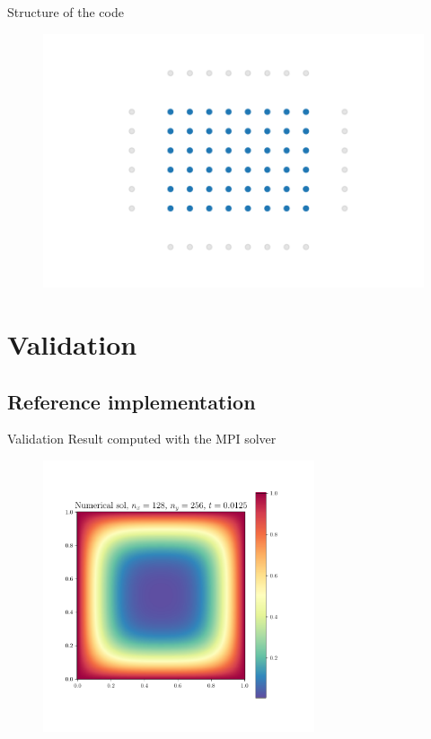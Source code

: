 \documentclass{beamer}
\begin{document}


\begin{frame}{Structure of the code}
    \begin{figure}
        \centering
        \includegraphics[width=0.8\linewidth]{Figures/step4.pdf}
    \end{figure}
\end{frame}



\section{Validation}
\subsection{Reference implementation}
\begin{frame}{Validation}
    Result computed with the MPI solver
    \begin{figure}
        \centering
        \includegraphics[height=8cm]{Figures/sol.pdf}
    \end{figure}
\end{frame}
\end{document}

